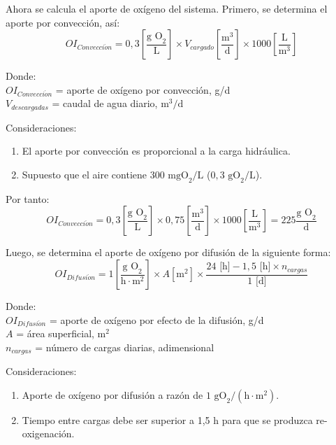 \documentclass[12pt, letterpaper]{report}
\begin{document}
Ahora se calcula el aporte de oxígeno del sistema. Primero, se determina el aporte por convección, así:
\begin{equation*}
OI_{Convecci\acute{o}n} = 0,3 \left[\frac{\text{g O}_2}{\text{L}}\right] \times V_{cargado} \left[\frac{\text{m}^3}{\text{d}}\right] \times 1000 \left[\frac{\text{L}}{\text{m}^3}\right]
\end{equation*}

Donde: \\
$OI_{Convecci\acute{o}n}$ = aporte de oxígeno por convección, g/d \\
$V_{descargadas}$ = caudal de agua diario, $\text{m}^3/\text{d}$

Consideraciones:
\begin{enumerate}
    \item El aporte por convección es proporcional a la carga hidráulica.
    \item Supuesto que el aire contiene $300\text{ mgO}_2/\text{L}$ ($0,3\text{ gO}_2/\text{L}$).
\end{enumerate}

Por tanto:
\begin{equation*}
OI_{Convecci\acute{o}n} = 0,3 \left[\frac{\text{g O}_2}{\text{L}}\right] \times 0,75 \left[\frac{\text{m}^3}{\text{d}}\right] \times 1000 \left[\frac{\text{L}}{\text{m}^3}\right] = 225 \frac{\text{g O}_2}{\text{d}}
\end{equation*}

Luego, se determina el aporte de oxígeno por difusión de la siguiente forma:
\begin{equation*}
OI_{Difusi\acute{o}n} = 1 \left[\frac{\text{g O}_2}{\text{h} \cdot \text{m}^2}\right] \times A [\text{m}^2] \times \frac{24\text{ [h]} - 1,5\text{ [h]} \times n_{cargas}}{1\text{ [d]}}
\end{equation*}

Donde: \\
$OI_{Difusi\acute{o}n}$ = aporte de oxígeno por efecto de la difusión, g/d \\
$A$ = área superficial, $\text{m}^2$ \\
$n_{cargas}$ = número de cargas diarias, adimensional

Consideraciones:
\begin{enumerate}
    \item Aporte de oxígeno por difusión a razón de $1\text{ gO}_2/(\text{h} \cdot \text{m}^2)$.
    \item Tiempo entre cargas debe ser superior a 1,5 h para que se produzca re-oxigenación.
\end{enumerate}
\end{document}
